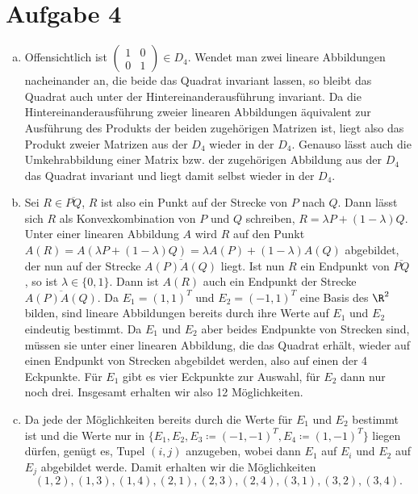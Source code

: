 \documentclass{article}
\begin{document}
    \section*{Aufgabe 4}
    \begin{enumerate}[(a)]
        \item Offensichtlich ist $\begin{pmatrix}
            1 & 0\\ 0 & 1
        \end{pmatrix} \in D_4$. Wendet man zwei lineare Abbildungen nacheinander an, die beide das Quadrat invariant lassen, so bleibt das Quadrat auch unter der Hintereinanderausführung invariant. Da die Hintereinanderausführung zweier linearen Abbildungen äquivalent zur Ausführung des Produkts der beiden zugehörigen Matrizen ist, liegt also das Produkt zweier Matrizen aus der $D_4$ wieder in der $D_4$. Genauso lässt auch die Umkehrabbildung einer Matrix bzw. der zugehörigen Abbildung aus der $D_4$ das Quadrat invariant und liegt damit selbst wieder in der $D_4$.
        \item Sei $R \in \overline{PQ}$, $R$ ist also ein Punkt auf der Strecke von $P$ nach $Q$. Dann lässt sich $R$ als Konvexkombination von $P$ und $Q$ schreiben, $R = \lambda P + (1-\lambda) Q$. Unter einer linearen Abbildung $A$ wird $R$ auf den Punkt $A(R) = A(\lambda P + (1-\lambda) Q) = \lambda A(P) + (1-\lambda) A(Q)$ abgebildet, der nun auf der Strecke $\overline{A(P)A(Q)}$ liegt. Ist nun $R$ ein Endpunkt von $\overline{PQ}$, so ist $\lambda\in \{0,1\}$. Dann ist $A(R)$ auch ein Endpunkt der Strecke $\overline{A(P)A(Q)}$. Da $E_1 = (1,1)^T$ und $E_2 = (-1,1)^T$ eine Basis des $\R^2$ bilden, sind lineare Abbildungen bereits durch ihre Werte auf $E_1$ und $E_2$ eindeutig bestimmt. Da $E_1$ und $E_2$ aber beides Endpunkte von Strecken sind, müssen sie unter einer linearen Abbildung, die das Quadrat erhält, wieder auf einen Endpunkt von Strecken abgebildet werden, also auf einen der 4 Eckpunkte. Für $E_1$ gibt es vier Eckpunkte zur Auswahl, für $E_2$ dann nur noch drei. Insgesamt erhalten wir also 12 Möglichkeiten.
        \item Da jede der Möglichkeiten bereits durch die Werte für $E_1$ und $E_2$ bestimmt ist und die Werte nur in $\{E_1, E_2, E_3 \coloneqq (-1,-1)^T, E_4 \coloneqq (1,-1)^T\}$ liegen dürfen, genügt es, Tupel $(i,j)$ anzugeben, wobei dann $E_1$ auf $E_i$ und $E_2$ auf $E_j$ abgebildet werde. Damit erhalten wir die Möglichkeiten
        \[(1,2), (1,3), (1,4), (2,1), (2,3), (2,4), (3,1), (3,2), (3,4).\]
    \end{enumerate} 
\end{document}

